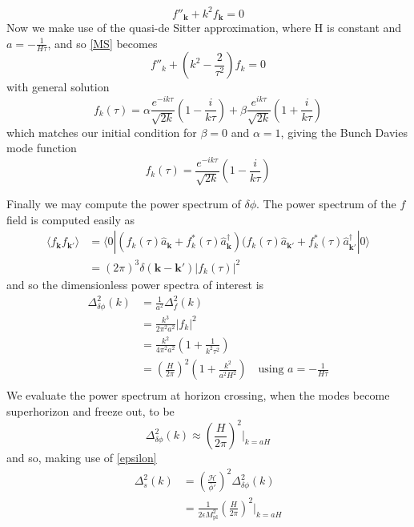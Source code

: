 \documentclass[a4paper,10pt]{article}
\renewcommand{\v}[1]{\mathbf{#1}}
\newcommand{\Mp}{M_{\text{pl}}}
\newcommand{\bphi}{\bar{\phi}}
\newcommand{\ann}[1]{\hat{a}_{\v{#1}}}
\newcommand{\cre}[1]{\hat{a}^\dagger_{\v{#1}}}
\begin{document}
\begin{equation}
f''_{\v{k}} + k^2f_{\v{k}} = 0
\end{equation}
Now we make use of the quasi-de Sitter approximation, where H is constant and $a=-\frac{1}{H\tau}$, and so \ref{MS} becomes
\begin{equation}
f''_k + (k^2-\frac{2}{\tau^2})f_k = 0
\end{equation}
with general solution
\begin{equation}
f_k(\tau) = \alpha \frac{e^{-ik\tau}}{\sqrt{2k}}\left(1-\frac{i}{k\tau}\right) + \beta \frac{e^{ik\tau}}{\sqrt{2k}}\left(1+\frac{i}{k\tau}\right)
\end{equation}
which matches our initial condition for $\beta = 0$ and $\alpha=1$, giving the Bunch Davies mode function 
\begin{equation}
f_k(\tau) = \frac{e^{-ik\tau}}{\sqrt{2k}}\left(1-\frac{i}{k\tau}\right)
\end{equation}

Finally we may compute the power spectrum of $\delta\phi$. The power spectrum of the $f$ field is computed easily as 
\begin{equation}
\begin{split}
\langle f_{\v{k}}f_{\v{k'}}\rangle &= \langle 0| (f_k(\tau)\ann{k}+f_k^*(\tau)\cre{k})(f_k(\tau)\ann{k'}+f_k^*(\tau)\cre{k'}|0\rangle \\
&= (2\pi)^3\delta(\v{k}-\v{k'})|f_k(\tau)|^2
\end{split}
\end{equation}
and so the dimensionless power spectra of interest is  
\begin{equation}\begin{split}
\Delta^2_{\delta\phi}(k) &= \frac{1}{a^2}\Delta^2_f(k)\\
&= \frac{k^3}{2\pi^2a^2}|f_k|^2\\
&=\frac{k^2}{4\pi^2a^2}\left(1+\frac{1}{k^2\tau^2}\right)\\
&=\left(\frac{H}{2\pi}\right)^2\left(1+\frac{k^2}{a^2H^2}\right) \quad \text{using $a=-\frac{1}{H\tau}$}\\
\label{inflatonpower}
\end{split}\end{equation}
We evaluate the power spectrum at horizon crossing, when the modes become superhorizon and freeze out, to be
\begin{equation}
\Delta^2_{\delta\phi}(k) \approx (\frac{H}{2\pi})^2\rvert_{k=aH}
\end{equation}
and so, making use of \ref{epsilon}
\begin{equation}\begin{split}
\Delta^2_s(k) &=\left(\frac{\mathcal{H}}{\bphi'}\right)^2\Delta^2_{\delta\phi}(k)\\
&=\frac{1}{2\epsilon\Mp^2}\left(\frac{H}{2\pi}\right)^2\rvert_{k=aH}
\end{split}\end{equation}
\end{document}
